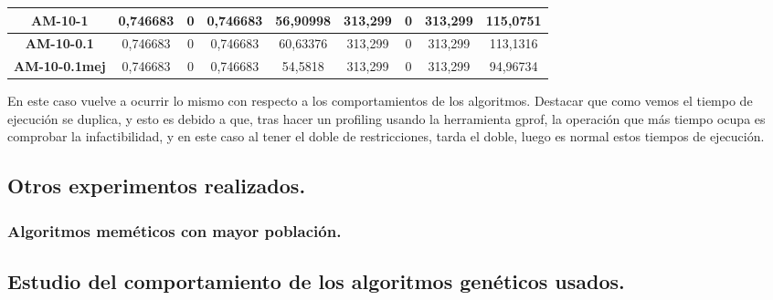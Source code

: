 \documentclass[12pt, spanish]{article}
\begin{document}
\begin{table}[H]
\begin{tabular}{|c|c|c|c|c|c|c|c|c|}
\textbf{AM-10-1}      & 0,746683                  & 0                           & 0,746683               & 56,90998   & 313,299                   & 0                           & 313,299                & 115,0751   \\ \hline
\textbf{AM-10-0.1}    &  0,746683               & 0                    &  0,746683                    & 60,63376      & 313,299                   & 0                           & 313,299                & 113,1316   \\ \hline
\textbf{AM-10-0.1mej} & 0,746683                  & 0                           & 0,746683               & 54,5818    & 313,299                   & 0                           & 313,299                & 94,96734   \\ \hline
\end{tabular}
\end{table}

En este caso vuelve a ocurrir lo mismo con respecto a los comportamientos de los algoritmos. Destacar que como vemos el tiempo de ejecución se duplica, y esto es debido a que, tras hacer un profiling usando la herramienta gprof, la operación que más tiempo ocupa es comprobar la infactibilidad, y en este caso al tener el doble de restricciones, tarda el doble, luego es normal estos tiempos de ejecución.


\subsection{Otros experimentos realizados.}

\subsubsection{Algoritmos meméticos con mayor población.}


\subsection{Estudio del comportamiento de los algoritmos genéticos usados.}
\end{document}
